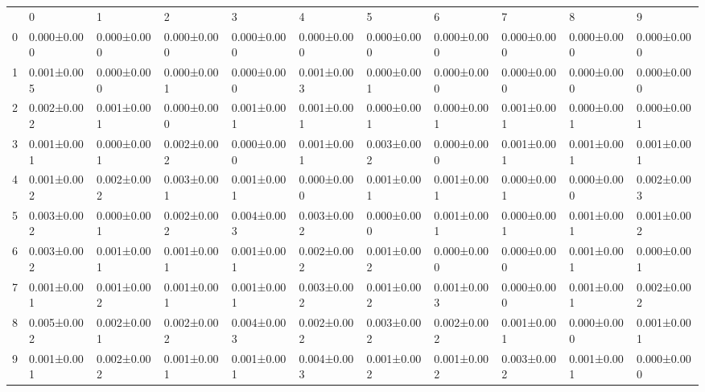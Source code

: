 \begin{tabular}{lllllllllll}
 & 0 & 1 & 2 & 3 & 4 & 5 & 6 & 7 & 8 & 9 \\
0 & 0.000±0.000 & 0.000±0.000 & 0.000±0.000 & 0.000±0.000 & 0.000±0.000 & 0.000±0.000 & 0.000±0.000 & 0.000±0.000 & 0.000±0.000 & 0.000±0.000 \\
1 & 0.001±0.005 & 0.000±0.000 & 0.000±0.001 & 0.000±0.000 & 0.001±0.003 & 0.000±0.001 & 0.000±0.000 & 0.000±0.000 & 0.000±0.000 & 0.000±0.000 \\
2 & 0.002±0.002 & 0.001±0.001 & 0.000±0.000 & 0.001±0.001 & 0.001±0.001 & 0.000±0.001 & 0.000±0.001 & 0.001±0.001 & 0.000±0.001 & 0.000±0.001 \\
3 & 0.001±0.001 & 0.000±0.001 & 0.002±0.002 & 0.000±0.000 & 0.001±0.001 & 0.003±0.002 & 0.000±0.000 & 0.001±0.001 & 0.001±0.001 & 0.001±0.001 \\
4 & 0.001±0.002 & 0.002±0.002 & 0.003±0.001 & 0.001±0.001 & 0.000±0.000 & 0.001±0.001 & 0.001±0.001 & 0.000±0.001 & 0.000±0.000 & 0.002±0.003 \\
5 & 0.003±0.002 & 0.000±0.001 & 0.002±0.002 & 0.004±0.003 & 0.003±0.002 & 0.000±0.000 & 0.001±0.001 & 0.000±0.001 & 0.001±0.001 & 0.001±0.002 \\
6 & 0.003±0.002 & 0.001±0.001 & 0.001±0.001 & 0.001±0.001 & 0.002±0.002 & 0.001±0.002 & 0.000±0.000 & 0.000±0.000 & 0.001±0.001 & 0.000±0.001 \\
7 & 0.001±0.001 & 0.001±0.002 & 0.001±0.001 & 0.001±0.001 & 0.003±0.002 & 0.001±0.002 & 0.001±0.003 & 0.000±0.000 & 0.001±0.001 & 0.002±0.002 \\
8 & 0.005±0.002 & 0.002±0.001 & 0.002±0.002 & 0.004±0.003 & 0.002±0.002 & 0.003±0.002 & 0.002±0.002 & 0.001±0.001 & 0.000±0.000 & 0.001±0.001 \\
9 & 0.001±0.001 & 0.002±0.002 & 0.001±0.001 & 0.001±0.001 & 0.004±0.003 & 0.001±0.002 & 0.001±0.002 & 0.003±0.002 & 0.001±0.001 & 0.000±0.000 \\
\end{tabular}
